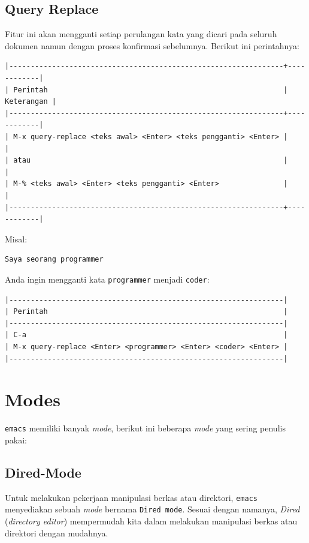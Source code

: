 \documentclass{article}
\begin{document}
\subsection{Query Replace}
Fitur ini akan mengganti setiap perulangan kata yang dicari pada seluruh dokumen
namun dengan proses konfirmasi sebelumnya. Berikut ini perintahnya:

\begin{verbatim}
|----------------------------------------------------------------+------------|
| Perintah                                                       | Keterangan |
|----------------------------------------------------------------+------------|
| M-x query-replace <teks awal> <Enter> <teks pengganti> <Enter> |            |
| atau                                                           |            |
| M-% <teks awal> <Enter> <teks pengganti> <Enter>               |            |
|----------------------------------------------------------------+------------|
\end{verbatim}

Misal:

\begin{verbatim}
Saya seorang programmer
\end{verbatim}

Anda ingin mengganti kata \verb=programmer= menjadi \verb=coder=:

\begin{verbatim}
|----------------------------------------------------------------|
| Perintah                                                       |
|----------------------------------------------------------------|
| C-a                                                            |
| M-x query-replace <Enter> <programmer> <Enter> <coder> <Enter> |
|----------------------------------------------------------------|
\end{verbatim}

\section{Modes}
\verb=emacs= memiliki banyak \emph{mode}, berikut ini beberapa \emph{mode} yang sering
penulis pakai:

\subsection{Dired-Mode}
Untuk melakukan pekerjaan manipulasi berkas atau direktori, \verb=emacs=
menyediakan sebuah \emph{mode} bernama \verb=Dired mode=. Sesuai dengan namanya,
\emph{Dired} (\emph{directory editor}) mempermudah kita dalam melakukan manipulasi berkas 
atau direktori dengan mudahnya.
\end{document}

